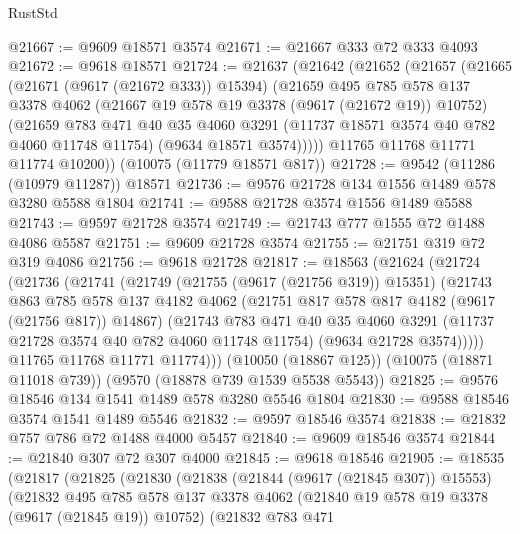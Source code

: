 \begin{lexlean}{RustStd}
\begin{coremodule}
@21667 := @9609 @18571 @3574
@21671 := @21667 @333 @72 @333 @4093
@21672 := @9618 @18571
@21724 := @21637
    (@21642
      (@21652
        (@21657
          (@21665
            (@21671 (@9617 (@21672 @333)) @15394)
            (@21659
              @495
              @785
              @578
              @137
              @3378
              @4062
              (@21667 @19 @578 @19 @3378 (@9617 (@21672 @19)) @10752)
              (@21659
                @783
                @471
                @40
                @35
                @4060
                @3291
                (@11737 @18571 @3574 @40 @782 @4060 @11748 @11754)
                (@9634 @18571 @3574)))))
        @11765
        @11768
        @11771
        @11774
        @10200))
    (@10075 (@11779 @18571 @817))
@21728 := @9542 (@11286 (@10979 @11287)) @18571
@21736 := @9576 @21728 @134 @1556 @1489 @578 @3280 @5588 @1804
@21741 := @9588 @21728 @3574 @1556 @1489 @5588
@21743 := @9597 @21728 @3574
@21749 := @21743 @777 @1555 @72 @1488 @4086 @5587
@21751 := @9609 @21728 @3574
@21755 := @21751 @319 @72 @319 @4086
@21756 := @9618 @21728
@21817 := @18563
    (@21624
      (@21724
        (@21736
          (@21741
            (@21749
              (@21755 (@9617 (@21756 @319)) @15351)
              (@21743
                @863
                @785
                @578
                @137
                @4182
                @4062
                (@21751 @817 @578 @817 @4182 (@9617 (@21756 @817)) @14867)
                (@21743
                  @783
                  @471
                  @40
                  @35
                  @4060
                  @3291
                  (@11737 @21728 @3574 @40 @782 @4060 @11748 @11754)
                  (@9634 @21728 @3574)))))
          @11765
          @11768
          @11771
          @11774)))
    (@10050 (@18867 @125))
    (@10075 (@18871 @11018 @739))
    (@9570 (@18878 @739 @1539 @5538 @5543))
@21825 := @9576 @18546 @134 @1541 @1489 @578 @3280 @5546 @1804
@21830 := @9588 @18546 @3574 @1541 @1489 @5546
@21832 := @9597 @18546 @3574
@21838 := @21832 @757 @786 @72 @1488 @4000 @5457
@21840 := @9609 @18546 @3574
@21844 := @21840 @307 @72 @307 @4000
@21845 := @9618 @18546
@21905 := @18535
    (@21817
      (@21825
        (@21830
          (@21838
            (@21844 (@9617 (@21845 @307)) @15553)
            (@21832
              @495
              @785
              @578
              @137
              @3378
              @4062
              (@21840 @19 @578 @19 @3378 (@9617 (@21845 @19)) @10752)
              (@21832
                @783
                @471

\end{coremodule}
\end{lexlean}
